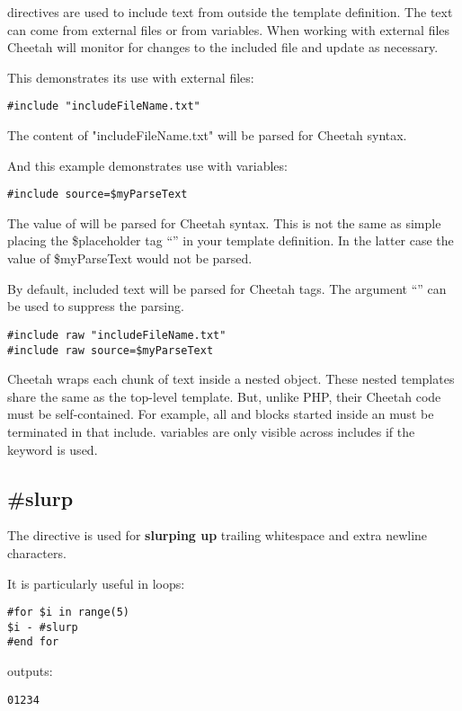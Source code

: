  directives are used to include text from outside the template
definition.  The text can come from external files or from 
variables.  When working with external files Cheetah will monitor for changes to
the included file and update as necessary.  

This demonstrates its use with external files:
\begin{verbatim}
#include "includeFileName.txt"
\end{verbatim}
The content of "includeFileName.txt" will be parsed for Cheetah syntax.

And this example demonstrates use with  variables:
\begin{verbatim}
#include source=$myParseText
\end{verbatim}
The value of  will be parsed for Cheetah syntax. This is not
the same as simple placing the \$placeholder tag ``'' in
your template definition.  In the latter case the value of \$myParseText would
not be parsed.

By default, included text will be parsed for Cheetah tags.  The argument
``'' can be used to suppress the parsing.

\begin{verbatim}
#include raw "includeFileName.txt"
#include raw source=$myParseText
\end{verbatim}

Cheetah wraps each chunk of  text inside a nested
 object.  These nested templates share the same 
as the top-level template. But, unlike PHP, their Cheetah code must be
self-contained.  For example, all  and  blocks started
inside an  must be terminated in that include. 
variables are only visible across includes if the  keyword is
used.


\subsection{\#slurp}
\label{directives.slurp}

The  directive is used for {\bf slurping up} trailing whitespace
and extra newline characters.


It is particularly useful in  loops:
\begin{verbatim}
#for $i in range(5)
$i - #slurp
#end for
\end{verbatim}
outputs:
\begin{verbatim}
01234
\end{verbatim}



